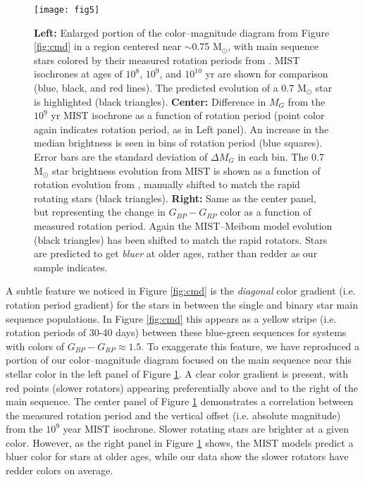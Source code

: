 \documentclass[preprint2]{aastex62}
\begin{document}
\begin{figure}
\centering
\texttt{[image: fig5]}
\caption{
{\bf Left:} Enlarged portion of the color--magnitude diagram from Figure \ref{fig:cmd} in a region centered near $\sim$0.75 M$_\odot$, with main sequence stars colored by their measured rotation periods from \citet{mcquillan2014}.
MIST isochrones at ages of $10^8$, $10^9$, and $10^{10}$ yr are shown for comparison (blue, black, and red lines). The predicted evolution of a 0.7 M$_\odot$ star is highlighted (black triangles). 
{\bf Center:} Difference in $M_G$ from the $10^9$ yr MIST isochrone as a function of rotation period (point color again indicates rotation period, as in Left panel). An increase in the median brightness is seen in bins of rotation period (blue squares). Error bars are the standard deviation of $\Delta M_G$ in each bin. The 0.7 M$_\odot$ star brightness evolution from MIST is shown as a function of rotation evolution from \citet{meibom2009}, manually shifted to match the rapid rotating stars (black triangles).
{\bf Right:} Same as the center panel, but representing the change in $G_{BP}-G_{RP}$ color as a function of measured rotation period. Again the MIST--Meibom model evolution (black triangles) has been shifted to match the rapid rotators. Stars are predicted to get {\it bluer} at older ages, rather than redder as our sample indicates.
}
\label{fig:cmd_zoom}
\end{figure}

A subtle feature we noticed in Figure \ref{fig:cmd} is the {\it diagonal} color gradient (i.e. rotation period gradient) for the stars in between the single and binary star main sequence populations. In Figure \ref{fig:cmd} this appears as a yellow stripe (i.e. rotation periods of 30-40 days) between these blue-green sequences for systems with colors of $G_{BP} - G_{RP} \approx 1.5$. To exaggerate this feature, we have reproduced a portion of our color--magnitude diagram focused on the main sequence near this stellar color in the left panel of Figure \ref{fig:cmd_zoom}. A clear color gradient is present, with red points (slower rotators) appearing preferentially above and to the right of the main sequence.
The center panel of Figure \ref{fig:cmd_zoom} demonstrates a correlation between the measured rotation period and the vertical offset (i.e. absolute magnitude) from the $10^9$ year MIST isochrone. Slower rotating stars are brighter at a given color.
However, as the right panel in Figure \ref{fig:cmd_zoom} shows, the MIST models predict a bluer color for stars at older ages, while our data show the slower rotators have redder colors on average.
\end{document}
